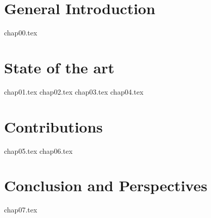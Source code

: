 \documentclass[a4paper,11pt,leqno,openbib]{memoir} %
\begin{document}
\frontmatter
{}
%

\clearemptydoublepage
%

\clearemptydoublepage
%

\clearemptydoublepage
%

\clearemptydoublepage
%

\renewcommand{\contentsname}{Table of Contents}
\tableofcontents*
{}
\clearemptydoublepage
%
\listoftables
{}
\clearemptydoublepage
%
\listoffigures
{}
\clearemptydoublepage
%

%
%
\mainmatter
%
\part{General Introduction}
%
{chap00.tex}
%
%
%
\part{State of the art}
%
{chap01.tex}
\clearemptydoublepage
%
%
%
%
%
{chap02.tex}
\clearemptydoublepage
%
%
{chap03.tex}
\clearemptydoublepage
%
%
{chap04.tex}
\clearemptydoublepage
%
%
%
\part{Contributions}
%
{chap05.tex}
\clearemptydoublepage
%
%   
%
%
{chap06.tex}
\clearemptydoublepage
%
%   
%
%
\part{Conclusion and Perspectives}
%
{chap07.tex}
\clearemptydoublepage
%
%   
%
%
\begin{appendices} %


%
\end{appendices}

\clearemptydoublepage
\backmatter



\clearemptydoublepage
%
\end{document}
